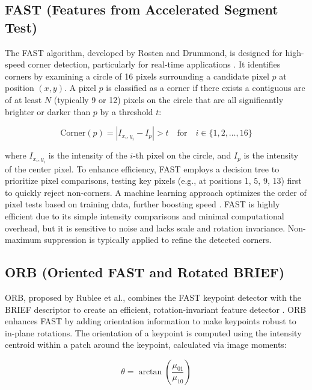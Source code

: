 \documentclass[journal]{IEEEtran}
\begin{document}
\subsection{FAST (Features from Accelerated Segment Test)}
The FAST algorithm, developed by Rosten and Drummond, is designed for high-speed corner detection, particularly for real-time applications \cite{FAST}. It identifies corners by examining a circle of 16 pixels surrounding a candidate pixel \( p \) at position \( (x, y) \). A pixel \( p \) is classified as a corner if there exists a contiguous arc of at least \( N \) (typically 9 or 12) pixels on the circle that are all significantly brighter or darker than \( p \) by a threshold \( t \):

\begin{equation}
\text{Corner}(p) = \left| I_{x_i, y_i} - I_p \right| > t \quad \text{for} \quad i \in \{1, 2, \ldots, 16\}
\end{equation}

where \( I_{x_i, y_i} \) is the intensity of the \( i \)-th pixel on the circle, and \( I_p \) is the intensity of the center pixel. To enhance efficiency, FAST employs a decision tree to prioritize pixel comparisons, testing key pixels (e.g., at positions 1, 5, 9, 13) first to quickly reject non-corners. A machine learning approach optimizes the order of pixel tests based on training data, further boosting speed \cite{FAST}. FAST is highly efficient due to its simple intensity comparisons and minimal computational overhead, but it is sensitive to noise and lacks scale and rotation invariance. Non-maximum suppression is typically applied to refine the detected corners.\\

\subsection{ORB (Oriented FAST and Rotated BRIEF)}
ORB, proposed by Rublee et al., combines the FAST keypoint detector with the BRIEF descriptor to create an efficient, rotation-invariant feature detector \cite{ORB}. ORB enhances FAST by adding orientation information to make keypoints robust to in-plane rotations. The orientation of a keypoint is computed using the intensity centroid within a patch around the keypoint, calculated via image moments:

\begin{equation}
\theta = \arctan\left(\frac{\mu_{01}}{\mu_{10}}\right)
\end{equation}
\end{document}
